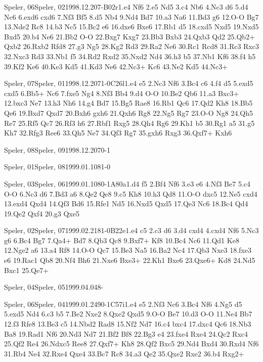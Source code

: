 \documentclass[twocolumn,a4paper,10pt]{report}
\begin{document}
\begin{chessgame}{Speler, 06}{Speler, 02}{1998.12.20}{7}{\textonehalf-\textonehalf}{B02r}{1.e4 Nf6 2.e5 Nd5 3.c4 Nb6 4.Nc3 d6 5.d4 Nc6 6.exd6 cxd6 7.Nf3 Bf5 8.d5 Nb4 9.Nd4 Bd7 10.a3 Na6 11.Bd3 g6 12.O-O Bg7 13.Nde2 Rc8 14.b3 Nc5 15.Bc2 e6 16.dxe6 Bxe6 17.Rb1 d5 18.cxd5 Nxd5 19.Nxd5 Bxd5 20.b4 Ne6 21.Bb2 O-O 22.Bxg7 Kxg7 23.Bb3 Bxb3 24.Qxb3 Qd2 25.Qb2+ Qxb2 26.Rxb2 Rfd8 27.g3 Ng5 28.Kg2 Rd3 29.Ra2 Ne6 30.Rc1 Rcd8 31.Rc3 Rxc3 32.Nxc3 Rd3 33.Nb1 f5 34.Rd2 Rxd2 35.Nxd2 Nd4 36.h3 b5 37.Nb1 Kf6 38.f4 h5 39.Kf2 Ke6 40.Ke3 Kd5 41.Kd3 Ne6 42.Nc3+ Kc6 43.Ne2 Kd5 44.Nc3+}\end{chessgame}
\begin{chessgame}{Speler, 07}{Speler, 01}{1998.12.20}{7}{1-0}{C26l}{1.e4 e5 2.Nc3 Nf6 3.Bc4 c6 4.f4 d5 5.exd5 cxd5 6.Bb5+ Nc6 7.fxe5 Ng4 8.Nf3 Bb4 9.d4 O-O 10.Be2 Qb6 11.a3 Bxc3+ 12.bxc3 Ne7 13.h3 Nh6 14.g4 Bd7 15.Bg5 Rae8 16.Rb1 Qc6 17.Qd2 Kh8 18.Bb5 Qe6 19.Bxd7 Qxd7 20.Bxh6 gxh6 21.Qxh6 Rg8 22.Ng5 Rg7 23.O-O Ng8 24.Qh5 Re7 25.Rf5 Qc7 26.Rf3 h6 27.Rbf1 Rxg5 28.Qh4 Rg6 29.Kh1 b5 30.Rg1 a5 31.g5 Kh7 32.Rfg3 Ree6 33.Qh5 Ne7 34.Qf3 Rg7 35.gxh6 Rxg3 36.Qxf7+ Kxh6}\end{chessgame}
\begin{chessempty}{Speler, 08}{Speler, 09}{1998.12.20}{7}{0-1}{}\end{chessempty}
\begin{chessempty}{Speler, 01}{Speler, 08}{1999.01.10}{8}{1-0}{}\end{chessempty}
\begin{chessgame}{Speler, 03}{Speler, 06}{1999.01.10}{8}{0-1}{A80a}{1.d4 f5 2.Bf4 Nf6 3.e3 e6 4.Nf3 Be7 5.c4 O-O 6.Nc3 d6 7.Bd3 a6 8.Qe2 Qe8 9.c5 Kh8 10.h3 Qd8 11.O-O dxc5 12.Ne5 cxd4 13.exd4 Qxd4 14.Qf3 Bd6 15.Rfe1 Nd5 16.Nxd5 Qxd5 17.Qe3 Nc6 18.Bc4 Qd4 19.Qe2 Qxf4 20.g3 Qxe5}\end{chessgame}
\begin{chessgame}{Speler, 02}{Speler, 07}{1999.02.21}{8}{1-0}{B22e}{1.e4 c5 2.c3 d6 3.d4 cxd4 4.cxd4 Nf6 5.Nc3 g6 6.Bc4 Bg7 7.Qa4+ Bd7 8.Qb3 Qc8 9.Bxf7+ Kf8 10.Bc4 Nc6 11.Qd1 Ke8 12.Nge2 a6 13.a4 Rf8 14.O-O Qc7 15.Be3 Na5 16.Ba2 Nc4 17.Qb3 Nxe3 18.fxe3 e6 19.Rac1 Qb8 20.Nf4 Bh6 21.Nxe6 Bxe3+ 22.Kh1 Bxe6 23.Qxe6+ Kd8 24.Nd5 Bxc1 25.Qe7+}\end{chessgame}
\begin{chessempty}{Speler, 04}{Speler, 05}{1999.04.04}{8}{\textonehalf-\textonehalf}{}\end{chessempty}
\begin{chessgame}{Speler, 06}{Speler, 04}{1999.01.24}{9}{0-1}{C57i}{1.e4 e5 2.Nf3 Nc6 3.Bc4 Nf6 4.Ng5 d5 5.exd5 Nd4 6.c3 b5 7.Be2 Nxe2 8.Qxe2 Qxd5 9.O-O Be7 10.d3 O-O 11.Ne4 Bb7 12.f3 Rfe8 13.Be3 c5 14.Nbd2 Rad8 15.Nf2 Nd7 16.c4 bxc4 17.dxc4 Qc6 18.Nb3 Ba8 19.Rad1 Nf6 20.Nd3 Nd7 21.Bf2 Bf8 22.Bg3 e4 23.fxe4 Rxe4 24.Qc2 Rxc4 25.Qf2 Re4 26.Ndxc5 Ree8 27.Qxf7+ Kh8 28.Qf2 Bxc5 29.Nd4 Bxd4 30.Rxd4 Nf6 31.Rb4 Ne4 32.Rxe4 Qxe4 33.Bc7 Rc8 34.a3 Qe2 35.Qxe2 Rxe2 36.b4 Rxg2+}\end{chessgame}
\end{document}
